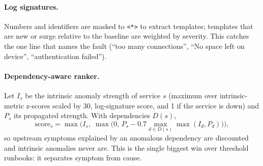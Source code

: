 \documentclass[11pt,a4paper]{article}
\newcommand{\code}[1]{\texttt{#1}}
\begin{document}
\paragraph{Log signatures.} Numbers and identifiers are masked to \code{<*>} to extract templates;
templates that are new or surge relative to the baseline are weighted by severity. This catches the
one line that names the fault (``too many connections'', ``No space left on device'',
``authentication failed'').

\paragraph{Dependency-aware ranker.} Let $I_s$ be the intrinsic anomaly strength of service $s$
(maximum over intrinsic-metric z-scores scaled by 30, log-signature score, and 1 if the service is
down) and $P_s$ its propagated strength. With dependencies $D(s)$,
\begin{equation}
  \text{score}_s = \max\!\Big(I_s,\; \max\big(0,\, P_s - 0.7 \max_{d\in D(s)} \max(I_d,P_d)\big)\Big),
  \label{eq:rank}
\end{equation}
so upstream symptoms explained by an anomalous dependency are discounted and intrinsic anomalies
never are. This is the single biggest win over threshold runbooks: it separates symptom from cause.
\end{document}
